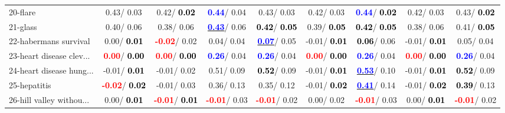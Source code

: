 \begin{table}[h]
\begin{center}
\begin{tabular}{lc|c|c|c|c|c|c|c}
20-flare &   0.43/  0.03 &   0.42/\textcolor{black}{\textbf{  0.02}} & \textcolor{blue}{\textbf{  0.44}}/  0.04 &   0.43/  0.03 &   0.42/  0.03 & \textcolor{blue}{\textbf{  0.44}}/\textcolor{black}{\textbf{  0.02}} &   0.42/  0.03 &   0.43/\textcolor{black}{\textbf{  0.02}} \\
21-glass &   0.40/  0.06 &   0.38/  0.06 & \underline{\textcolor{blue}{\textbf{  0.43}}}/  0.06 & \textcolor{black}{\textbf{  0.42}}/\textcolor{black}{\textbf{  0.05}} &   0.39/\textcolor{black}{\textbf{  0.05}} & \textcolor{black}{\textbf{  0.42}}/\textcolor{black}{\textbf{  0.05}} &   0.38/  0.06 &   0.41/\textcolor{black}{\textbf{  0.05}} \\ \hline
22-habermans survival &   0.00/\textcolor{black}{\textbf{  0.01}} & \textcolor{red}{\textbf{ -0.02}}/  0.02 &   0.04/  0.04 & \underline{\textcolor{blue}{\textbf{  0.07}}}/  0.05 &  -0.01/\textcolor{black}{\textbf{  0.01}} & \textcolor{black}{\textbf{  0.06}}/  0.06 &  -0.01/\textcolor{black}{\textbf{  0.01}} &   0.05/  0.04 \\
23-heart disease clev... & \textcolor{red}{\textbf{  0.00}}/\textcolor{black}{\textbf{  0.00}} & \textcolor{red}{\textbf{  0.00}}/\textcolor{black}{\textbf{  0.00}} & \textcolor{blue}{\textbf{  0.26}}/  0.04 & \textcolor{blue}{\textbf{  0.26}}/  0.04 & \textcolor{red}{\textbf{  0.00}}/\textcolor{black}{\textbf{  0.00}} & \textcolor{blue}{\textbf{  0.26}}/  0.04 & \textcolor{red}{\textbf{  0.00}}/\textcolor{black}{\textbf{  0.00}} & \textcolor{blue}{\textbf{  0.26}}/  0.04 \\
24-heart disease hung... &  -0.01/\textcolor{black}{\textbf{  0.01}} &  -0.01/  0.02 &   0.51/  0.09 & \textcolor{black}{\textbf{  0.52}}/  0.09 &  -0.01/\textcolor{black}{\textbf{  0.01}} & \underline{\textcolor{blue}{\textbf{  0.53}}}/  0.10 &  -0.01/\textcolor{black}{\textbf{  0.01}} & \textcolor{black}{\textbf{  0.52}}/  0.09 \\
25-hepatitis & \textcolor{red}{\textbf{ -0.02}}/\textcolor{black}{\textbf{  0.02}} &  -0.01/  0.03 &   0.36/  0.13 &   0.35/  0.12 &  -0.01/\textcolor{black}{\textbf{  0.02}} & \underline{\textcolor{blue}{\textbf{  0.41}}}/  0.14 &  -0.01/\textcolor{black}{\textbf{  0.02}} & \textcolor{black}{\textbf{  0.39}}/  0.13 \\
26-hill valley withou... &   0.00/\textcolor{black}{\textbf{  0.01}} & \textcolor{red}{\textbf{ -0.01}}/\textcolor{black}{\textbf{  0.01}} & \textcolor{red}{\textbf{ -0.01}}/  0.03 & \textcolor{red}{\textbf{ -0.01}}/  0.02 &   0.00/  0.02 & \textcolor{red}{\textbf{ -0.01}}/  0.03 &   0.00/\textcolor{black}{\textbf{  0.01}} & \textcolor{red}{\textbf{ -0.01}}/  0.02 \\

\end{tabular}
\end{center}
\end{table}
